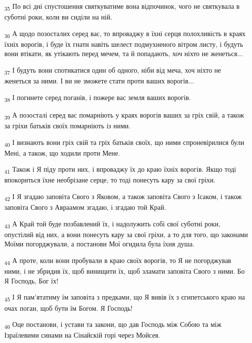 \begin{tcolorbox}
\textsubscript{35} По всі дні спустошення святкуватиме вона відпочинок, чого не святкувала в суботні роки, коли ви сиділи на ній.
\end{tcolorbox}
\begin{tcolorbox}
\textsubscript{36} А щодо позосталих серед вас, то впроваджу в їхні серця полохливість в краях їхніх ворогів, і буде їх гнати навіть шелест подмухненого вітром листу, і будуть вони втікати, як утікають перед мечем, та й попадають, хоч ніхто не женеться...
\end{tcolorbox}
\begin{tcolorbox}
\textsubscript{37} І будуть вони спотикатися один об одного, ніби від меча, хоч ніхто не женеться за ними. І ви не зможете стати проти ваших ворогів...
\end{tcolorbox}
\begin{tcolorbox}
\textsubscript{38} І погинете серед поганів, і пожере вас земля ваших ворогів.
\end{tcolorbox}
\begin{tcolorbox}
\textsubscript{39} А позосталі серед вас помарніють у краях ворогів ваших за гріх свій, а також за гріхи батьків своїх помарніють із ними.
\end{tcolorbox}
\begin{tcolorbox}
\textsubscript{40} І визнають вони гріх свій та гріх батьків своїх, що ними спроневірилися були Мені, а також, що ходили проти Мене.
\end{tcolorbox}
\begin{tcolorbox}
\textsubscript{41} Також і Я піду проти них, і впроваджу їх до краю їхніх ворогів. Якщо тоді впокориться їхне необрізане серце, то тоді понесуть кару за свої гріхи.
\end{tcolorbox}
\begin{tcolorbox}
\textsubscript{42} І Я згадаю заповіта Свого з Яковом, а також заповіта Свого з Ісаком, і також заповіта Свого з Авраамом згадаю, і згадаю той Край.
\end{tcolorbox}
\begin{tcolorbox}
\textsubscript{43} А Край той буде позбавлений їх, і надолужить собі свої суботні роки, опустілий від них, а вони понесуть кару за свої гріхи, а то для того, що законами Моїми погорджували, а постанови Мої огидила була їхня душа.
\end{tcolorbox}
\begin{tcolorbox}
\textsubscript{44} А проте, коли вони пробували в краю своїх ворогів, то Я не погорджував ними, і не збридив їх, щоб винищити їх, щоб зламати заповіта Свого з ними. Бо Я Господь, Бог їх!
\end{tcolorbox}
\begin{tcolorbox}
\textsubscript{45} І Я пам'ятатиму їм заповіта з предками, що Я вивів їх з єгипетського краю на очах поган, щоб бути їм Богом. Я Господь!
\end{tcolorbox}
\begin{tcolorbox}
\textsubscript{46} Оце постанови, і устави та закони, що дав Господь між Собою та між Ізраїлевими синами на Сінайскій горі через Мойсея.
\end{tcolorbox}
